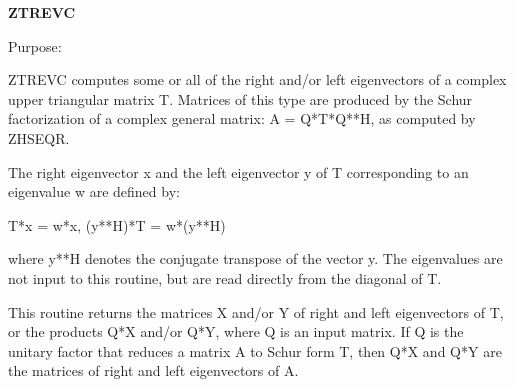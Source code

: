 {\bfseries Z\+T\+R\+E\+V\+C} 

 \begin{DoxyParagraph}{Purpose\+: }
\begin{DoxyVerb} ZTREVC computes some or all of the right and/or left eigenvectors of
 a complex upper triangular matrix T.
 Matrices of this type are produced by the Schur factorization of
 a complex general matrix:  A = Q*T*Q**H, as computed by ZHSEQR.
 
 The right eigenvector x and the left eigenvector y of T corresponding
 to an eigenvalue w are defined by:
 
              T*x = w*x,     (y**H)*T = w*(y**H)
 
 where y**H denotes the conjugate transpose of the vector y.
 The eigenvalues are not input to this routine, but are read directly
 from the diagonal of T.
 
 This routine returns the matrices X and/or Y of right and left
 eigenvectors of T, or the products Q*X and/or Q*Y, where Q is an
 input matrix.  If Q is the unitary factor that reduces a matrix A to
 Schur form T, then Q*X and Q*Y are the matrices of right and left
 eigenvectors of A.\end{DoxyVerb}
 
\end{DoxyParagraph}

